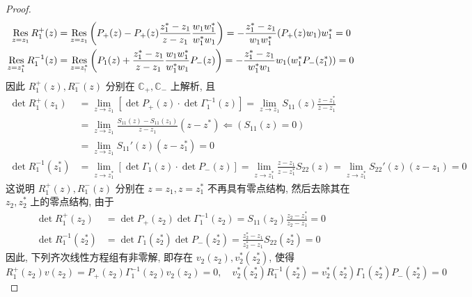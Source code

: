 \begin{proof}
\begin{equation}
\begin{aligned}
      \operatorname*{Res}_{z = z_1} R_{1}^{+}(z) &= \operatorname*{Res}_{z = z_{1}} \left(P_{+}(z) - P_{+}(z) \frac{z_{1}^{*} - z_{1}}{z - z_{1}} \frac{w_{1}w_{1}^{*}}{w_{1}^{*}w_{1}}\right) = - \frac{z_{1}^{*}-z_{1} }{w_{1}w_{1}^{*}}(P_{+}(z) w_{1}) w_{1}^{*} = 0 \\
      \operatorname*{Res}_{z = z_{1}^{*}} R_{1}^{-1}(z) &= \operatorname*{Res}_{z = z_{!}^{*}} \left(P_{1}(z) + \frac{z_{1}^{*} - z_{1}}{z - z_{1}} \frac{w_{1}w_{1}^{*}}{w_{1}^{*}w_{1}} P_{-}(z)\right) = - \frac{z_{1}^{*} - z_{1}}{w_{1}^{*}w_{1}} w_{1} (w_{1}^{*} P_{-}(z_{1}^{*})) = 0
    \end{aligned}
  \end{equation}
  因此 $ R_{1}^{+}(z), R_{1}^{-}(z) $ 分别在 $ \mathbb{C_{+}}, \mathbb{C_{-}} $ 上解析, 且
  \begin{equation}
    \begin{aligned}
      \det R_{1}^{+}(z_{1}) &= \lim_{z \to z_{1}} \left[ \det P_{+}(z) \cdot \det \Gamma_{1}^{-1}(z)\right] = \lim_{z \to z_{1}} S_{11}(z) \frac{z - z_{1}^{*}}{z-z_{1}} \\
      &= \lim_{z \to z_{1}} \frac{S_{11}(z) - S_{11}(z_{1})}{z - z_{1}} (z - z^{*}) \Leftarrow (S_{11}(z) = 0)\\
       &= \lim_{z \to z_{1}} S_{11}'(z) (z - z_{1}^{*}) = 0 \\
      \det R_{1}^{-1}(z_{1}^{*}) &= \lim_{z \to z_{1}^{*}} \left[ \det \Gamma_{1}(z) \cdot \det P_{-}(z)\right] = \lim_{z \to z_{1}^{*}} \frac{z - z_{1}}{z - z_{1}^{*}} S_{22}(z) = \lim_{z \to z_{1}^{*}} S_{22}'(z) (z - z_{1}) = 0
    \end{aligned}
  \end{equation}
  这说明 $ R_{1}^{+}(z), R_{1}^{-}(z) $ 分别在 $ z = z_{1}, z= z_{1}^{*} $ 不再具有零点结构, 然后去除其在 $ z_{2}, z_{2}^{*} $ 上的零点结构, 由于
  \begin{equation}
    \begin{aligned}
      \det R_{1}^{+}(z_{2}) &= \det P_{+}(z_{2}) \det \Gamma_{1}^{-1}(z_{2}) = S_{11}(z_{2}) \frac{z_{2} - z_{1}^{*}}{z_{2} - z_{1}} = 0 \\
      \det R_{1}^{-1}(z_{2}^{*}) &= \det \Gamma_{1}(z_{2}^{*}) \det P_{-}(z_{2}^{*}) = \frac{z_{2}^{*} - z_{1}}{z_{2}^{*} - z_{1}} S_{22}(z_{2}^{*}) = 0
    \end{aligned}
  \end{equation}
  因此, 下列齐次线性方程组有非零解, 即存在 $ v_{2}(z_{2}), v_{2}^{*}(z_{2}^{*}) $, 使得
  \begin{equation}
    R_{1}^{+}(z_{2}) v(z_{2}) = P_{+}(z_{2}) \Gamma_{1}^{-1}(z_{2})v_{2}(z_{2}) = 0, \quad v_{2}^{*}(z_{2}^{*}) R_{1}^{-1}(z_{2}^{*}) = v_{2}^{*}(z_{2}^{*}) \Gamma_{1}(z_{2}^{*}) P_{-}(z_{2}^{*}) = 0

\end{equation}
\end{proof}
